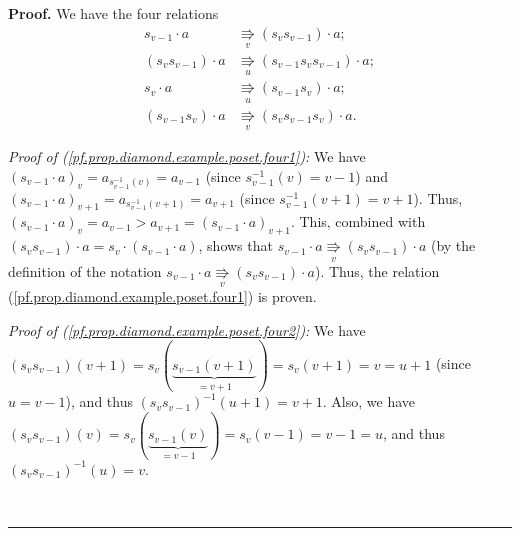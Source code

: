 \documentclass[numbers=enddot,12pt,final,onecolumn,notitlepage]{scrartcl}%
\theoremstyle{definition}
\newenvironment{proof}[1][Proof]{\noindent\textbf{#1.} }{\ \rule{0.5em}{0.5em}}
\newenvironment{verlong}{}{}
\begin{document}
\begin{proof}
\begin{verlong}
We have the four relations%
\begin{align}
s_{v-1}\cdot a  &  \underset{v}{\Rrightarrow}\left(  s_{v}s_{v-1}\right)
\cdot a;\label{pf.prop.diamond.example.poset.four1}\\
\left(  s_{v}s_{v-1}\right)  \cdot a  &  \underset{u}{\Rrightarrow}\left(
s_{v-1}s_{v}s_{v-1}\right)  \cdot
a;\label{pf.prop.diamond.example.poset.four2}\\
s_{v}\cdot a  &  \underset{u}{\Rrightarrow}\left(  s_{v-1}s_{v}\right)  \cdot
a;\label{pf.prop.diamond.example.poset.four3}\\
\left(  s_{v-1}s_{v}\right)  \cdot a  &  \underset{v}{\Rrightarrow}\left(
s_{v}s_{v-1}s_{v}\right)  \cdot a. \label{pf.prop.diamond.example.poset.four4}%
\end{align}

\textit{Proof of (\ref{pf.prop.diamond.example.poset.four1}):} We have
$\left(  s_{v-1}\cdot a\right)  _{v}=a_{s_{v-1}^{-1}\left(  v\right)
}=a_{v-1}$ (since $s_{v-1}^{-1}\left(  v\right)  =v-1$) and $\left(
s_{v-1}\cdot a\right)  _{v+1}=a_{s_{v-1}^{-1}\left(  v+1\right)  }=a_{v+1}$
(since $s_{v-1}^{-1}\left(  v+1\right)  =v+1$). Thus, $\left(  s_{v-1}\cdot
a\right)  _{v}=a_{v-1}>a_{v+1}=\left(  s_{v-1}\cdot a\right)  _{v+1}$. This,
combined with $\left(  s_{v}s_{v-1}\right)  \cdot a=s_{v}\cdot\left(
s_{v-1}\cdot a\right)  $, shows that $s_{v-1}\cdot a\underset{v}{\Rrightarrow
}\left(  s_{v}s_{v-1}\right)  \cdot a$ (by the definition of the notation
$s_{v-1}\cdot a\underset{v}{\Rrightarrow}\left(  s_{v}s_{v-1}\right)  \cdot
a$). Thus, the relation (\ref{pf.prop.diamond.example.poset.four1}) is proven.

\textit{Proof of (\ref{pf.prop.diamond.example.poset.four2}):} We have
$\left(  s_{v}s_{v-1}\right)  \left(  v+1\right)  =s_{v}\left(
\underbrace{s_{v-1}\left(  v+1\right)  }_{=v+1}\right)  =s_{v}\left(
v+1\right)  =v=u+1$ (since $u=v-1$),
and thus $\left(  s_{v}s_{v-1}\right)  ^{-1}\left(  u+1\right)
=v+1$. Also, we have $\left(  s_{v}s_{v-1}\right)  \left(  v\right)
=s_{v}\left(  \underbrace{s_{v-1}\left(  v\right)  }_{=v-1}\right)
=s_{v}\left(  v-1\right)  =v-1=u$,
and thus $\left(  s_{v}s_{v-1}\right)^{-1}\left( u\right)  =v$.


\end{verlong}
\end{proof}
\end{document}
